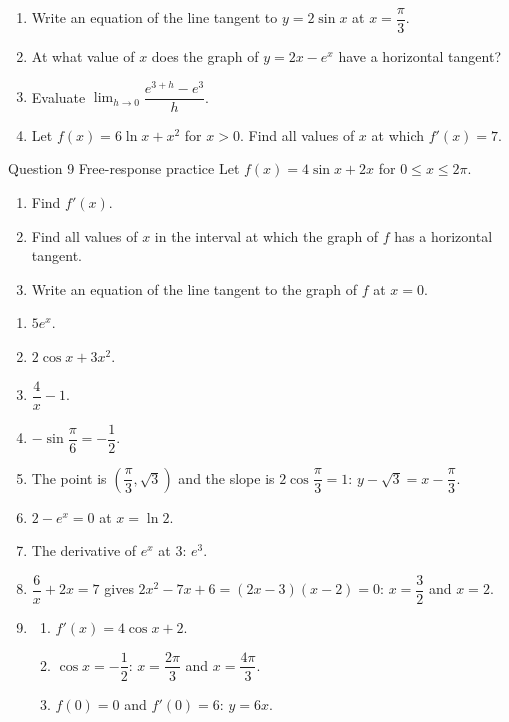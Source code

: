 \documentclass[11pt]{article}
\begin{document}
\begin{enumerate}[leftmargin=*,itemsep=2pt,start=5]
  \item Write an equation of the line tangent to $y=2\sin x$ at $x=\dfrac\pi3$.\work{2.8cm}
  \item At what value of $x$ does the graph of $y=2x-e^{x}$ have a horizontal tangent?\work{2.8cm}
  \item Evaluate $\displaystyle\lim_{h\to 0}\dfrac{e^{3+h}-e^{3}}{h}$.\work{2.8cm}
  \item Let $f(x)=6\ln x+x^2$ for $x>0$. Find all values of $x$ at which $f'(x)=7$.\work{2.8cm}
\end{enumerate}

\begin{frbox}{Question 9 \textperiodcentered{} Free-response practice}
Let $f(x)=4\sin x+2x$ for $0\le x\le2\pi$.
\begin{enumerate}[label=(\alph*),leftmargin=*,itemsep=2pt]
  \item Find $f'(x)$.\work{2.6cm}
  \item Find all values of $x$ in the interval at which the graph of $f$ has a horizontal tangent.\work{2.6cm}
  \item Write an equation of the line tangent to the graph of $f$ at $x=0$.\work{2.6cm}
\end{enumerate}
\end{frbox}

\newpage
\begin{solbox}
\begin{enumerate}[leftmargin=*,itemsep=4pt]
  \item $5e^{x}$.
  \item $2\cos x+3x^2$.
  \item $\dfrac4x-1$.
  \item $-\sin\dfrac\pi6=-\dfrac12$.
  \item The point is $\left(\dfrac\pi3,\sqrt3\right)$ and the slope is $2\cos\dfrac\pi3=1$: $y-\sqrt3=x-\dfrac\pi3$.
  \item $2-e^{x}=0$ at $x=\ln2$.
  \item The derivative of $e^{x}$ at 3: $e^{3}$.
  \item $\dfrac6x+2x=7$ gives $2x^2-7x+6=(2x-3)(x-2)=0$: $x=\dfrac32$ and $x=2$.
  \item \begin{enumerate}[label=(\alph*),leftmargin=*,itemsep=3pt]
    \item $f'(x)=4\cos x+2$.
    \item $\cos x=-\dfrac12$: $x=\dfrac{2\pi}{3}$ and $x=\dfrac{4\pi}{3}$.
    \item $f(0)=0$ and $f'(0)=6$: $y=6x$.
  \end{enumerate}
\end{enumerate}
\end{solbox}
\end{document}
